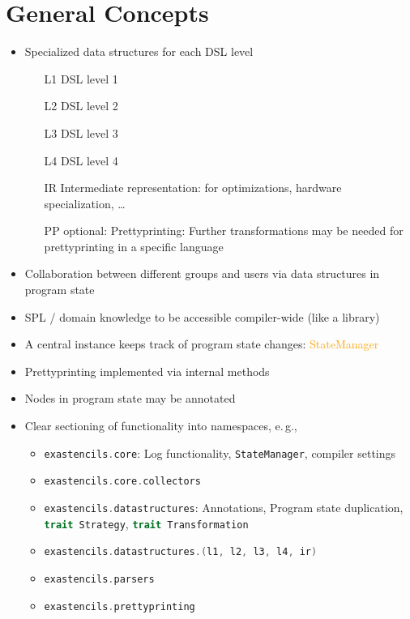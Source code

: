 \documentclass{article}
\newcommand{\hlA}[1]{\textcolor{orange}{#1}}
\begin{document}
\section{General Concepts}

\begin{itemize}
 \item Specialized data structures for each DSL level
 \begin{enumerate}
  \item[L1] DSL level 1
  \item[L2] DSL level 2
  \item[L3] DSL level 3
  \item[L4] DSL level 4
  \item[IR] Intermediate representation: for optimizations, hardware specialization, \ldots
  \item[PP] optional: Prettyprinting: Further transformations may be needed for prettyprinting in a specific language
 \end{enumerate}

 \item Collaboration between different groups and users via data structures in program state
 \item SPL / domain knowledge to be accessible compiler-wide (like a library)
 
  \item A central instance keeps track of program state changes: \hlA{StateManager}
 \item Prettyprinting implemented via internal methods
 \item Nodes in program state may be annotated
 \item Clear sectioning of functionality into namespaces, e.\,g.,
 \begin{itemize}
   \item \lstinline[language=scala]{exastencils.core}: Log functionality, \lstinline[language=scala]{StateManager}, compiler settings
   \item \lstinline[language=scala]{exastencils.core.collectors}
   \item \lstinline[language=scala]{exastencils.datastructures}: Annotations, Program state duplication, \lstinline[language=scala]{trait Strategy}, \lstinline[language=scala]{trait Transformation}
   \item \lstinline[language=scala]{exastencils.datastructures.(l1, l2, l3, l4, ir)}
   \item \lstinline[language=scala]{exastencils.parsers}
   \item \lstinline[language=scala]{exastencils.prettyprinting}
 \end{itemize}
\end{itemize}
\end{document}
